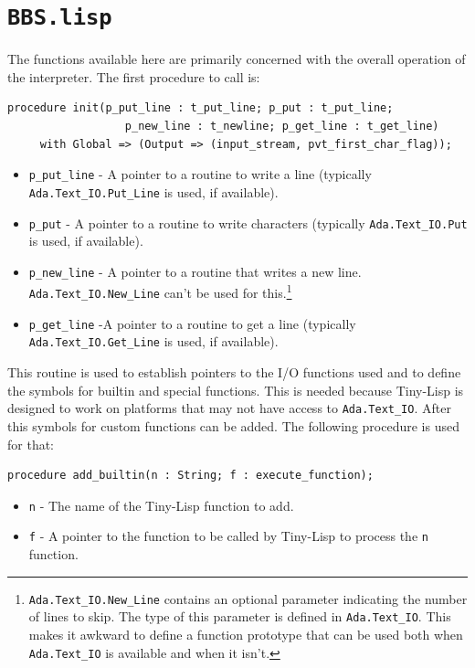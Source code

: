 \documentclass[10pt, openany]{book}
\newcommand{\package}[1]{\texttt{#1}}
\newcommand{\function}[1]{\texttt{#1}}
\newcommand{\keyword}[1]{\texttt{#1}}
\newcommand{\tl}{Tiny-Lisp}
\begin{document}
\section{\package{BBS.lisp}}
The functions available here are primarily concerned with the overall operation of the interpreter.  The first procedure to call is:
\begin{lstlisting}
procedure init(p_put_line : t_put_line; p_put : t_put_line;
                  p_new_line : t_newline; p_get_line : t_get_line)
     with Global => (Output => (input_stream, pvt_first_char_flag));
\end{lstlisting}
\begin{itemize}
  \item \keyword{p\_put\_line} - A pointer to a routine to write a line (typically \function{Ada.Text\_IO.Put\_Line} is used, if available).
  \item \keyword{p\_put} - A pointer to a routine to write characters (typically \function{Ada.Text\_IO.Put} is used, if available).
  \item \keyword{p\_new\_line} - A pointer to a routine that writes a new line.  \function{Ada.Text\_IO.New\_Line} can't be used for this.\footnote{\function{Ada.Text\_IO.New\_Line} contains an optional parameter indicating the number of lines to skip.  The type of this parameter is defined in \package{Ada.Text\_IO}.  This makes it awkward to define a function prototype that can be used both when \package{Ada.Text\_IO} is available and when it isn't.}

  \item \keyword{p\_get\_line} -A pointer to a routine to get a line (typically \function{Ada.Text\_IO.Get\_Line} is used, if available).
\end{itemize}
This routine is used to establish pointers to the I/O functions used and to define the symbols for builtin and special functions.  This is needed because \tl{} is designed to work on platforms that may not have access to \package{Ada.Text\_IO}.  After this symbols for custom functions can be added.  The following procedure is used for that:
\begin{lstlisting}
procedure add_builtin(n : String; f : execute_function);
\end{lstlisting}
\begin{itemize}
  \item \keyword{n} - The name of the \tl{} function to add.
  \item \keyword{f} - A pointer to the function to be called by \tl{} to process the \keyword{n} function.
\end{itemize}
\end{document}
